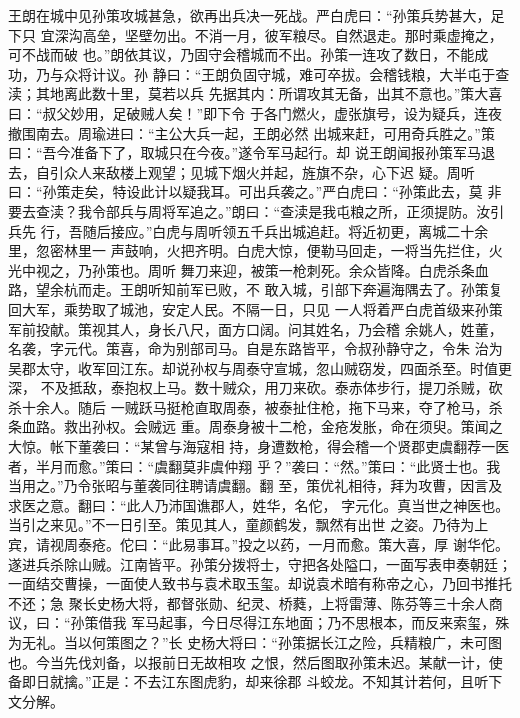 王朗在城中见孙策攻城甚急，欲再出兵决一死战。严白虎曰：“孙策兵势甚大，足下只
宜深沟高垒，坚壁勿出。不消一月，彼军粮尽。自然退走。那时乘虚掩之，可不战而破
也。”朗依其议，乃固守会稽城而不出。孙策一连攻了数日，不能成功，乃与众将计议。孙
静曰：“王朗负固守城，难可卒拔。会稽钱粮，大半屯于查渎；其地离此数十里，莫若以兵
先据其内：所谓攻其无备，出其不意也。”策大喜曰：“叔父妙用，足破贼人矣！”即下令
于各门燃火，虚张旗号，设为疑兵，连夜撤围南去。周瑜进曰：“主公大兵一起，王朗必然
出城来赶，可用奇兵胜之。”策曰：“吾今准备下了，取城只在今夜。”遂令军马起行。却
说王朗闻报孙策军马退去，自引众人来敌楼上观望；见城下烟火并起，旌旗不杂，心下迟
疑。周听曰：“孙策走矣，特设此计以疑我耳。可出兵袭之。”严白虎曰：“孙策此去，莫
非要去查渎？我令部兵与周将军追之。”朗曰：“查渎是我屯粮之所，正须提防。汝引兵先
行，吾随后接应。”白虎与周听领五千兵出城追赶。将近初更，离城二十余里，忽密林里一
声鼓响，火把齐明。白虎大惊，便勒马回走，一将当先拦住，火光中视之，乃孙策也。周听
舞刀来迎，被策一枪刺死。余众皆降。白虎杀条血路，望余杭而走。王朗听知前军已败，不
敢入城，引部下奔遍海隅去了。孙策复回大军，乘势取了城池，安定人民。不隔一日，只见
一人将着严白虎首级来孙策军前投献。策视其人，身长八尺，面方口阔。问其姓名，乃会稽
余姚人，姓董，名袭，字元代。策喜，命为别部司马。自是东路皆平，令叔孙静守之，令朱
治为吴郡太守，收军回江东。却说孙权与周泰守宣城，忽山贼窃发，四面杀至。时值更深，
不及抵敌，泰抱权上马。数十贼众，用刀来砍。泰赤体步行，提刀杀贼，砍杀十余人。随后
一贼跃马挺枪直取周泰，被泰扯住枪，拖下马来，夺了枪马，杀条血路。救出孙权。会贼远
重。周泰身被十二枪，金疮发胀，命在须臾。策闻之大惊。帐下董袭曰：“某曾与海寇相
持，身遭数枪，得会稽一个贤郡吏虞翻荐一医者，半月而愈。”策曰：“虞翻莫非虞仲翔
乎？”袭曰：“然。”策曰：“此贤士也。我当用之。”乃令张昭与董袭同往聘请虞翻。翻
至，策优礼相待，拜为攻曹，因言及求医之意。翻曰：“此人乃沛国谯郡人，姓华，名佗，
字元化。真当世之神医也。当引之来见。”不一日引至。策见其人，童颜鹤发，飘然有出世
之姿。乃待为上宾，请视周泰疮。佗曰：“此易事耳。”投之以药，一月而愈。策大喜，厚
谢华佗。遂进兵杀除山贼。江南皆平。孙策分拨将士，守把各处隘口，一面写表申奏朝廷；
一面结交曹操，一面使人致书与袁术取玉玺。却说袁术暗有称帝之心，乃回书推托不还；急
聚长史杨大将，都督张勋、纪灵、桥蕤，上将雷薄、陈芬等三十余人商议，曰：“孙策借我
军马起事，今日尽得江东地面；乃不思根本，而反来索玺，殊为无礼。当以何策图之？”长
史杨大将曰：“孙策据长江之险，兵精粮广，未可图也。今当先伐刘备，以报前日无故相攻
之恨，然后图取孙策未迟。某献一计，使备即日就擒。”正是：不去江东图虎豹，却来徐郡
斗蛟龙。不知其计若何，且听下文分解。